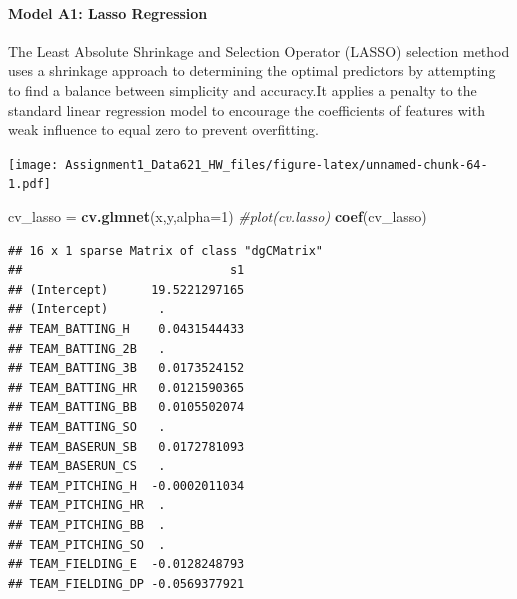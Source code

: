\documentclass[
]{article}
\newenvironment{Shaded}{\begin{snugshade}}{\end{snugshade}}
\newcommand{\AttributeTok}[1]{\textcolor[rgb]{0.13,0.29,0.53}{#1}}
\newcommand{\CommentTok}[1]{\textcolor[rgb]{0.56,0.35,0.01}{\textit{#1}}}
\newcommand{\ConstantTok}[1]{\textcolor[rgb]{0.56,0.35,0.01}{#1}}
\newcommand{\DecValTok}[1]{\textcolor[rgb]{0.00,0.00,0.81}{#1}}
\newcommand{\FunctionTok}[1]{\textcolor[rgb]{0.13,0.29,0.53}{\textbf{#1}}}
\newcommand{\NormalTok}[1]{#1}
\newcommand{\OtherTok}[1]{\textcolor[rgb]{0.56,0.35,0.01}{#1}}
\newcommand{\SpecialCharTok}[1]{\textcolor[rgb]{0.81,0.36,0.00}{\textbf{#1}}}
\newcommand{\StringTok}[1]{\textcolor[rgb]{0.31,0.60,0.02}{#1}}
\begin{document}
\paragraph{Model A1: Lasso Regression}\label{model-a1-lasso-regression}

The Least Absolute Shrinkage and Selection Operator (LASSO) selection
method uses a shrinkage approach to determining the optimal predictors
by attempting to find a balance between simplicity and accuracy.It
applies a penalty to the standard linear regression model to encourage
the coefficients of features with weak influence to equal zero to
prevent overfitting.

\begin{Shaded}
\end{Shaded}

\texttt{[image: Assignment1\_Data621\_HW\_files/figure-latex/unnamed-chunk-64-1.pdf]}

\begin{Shaded}
\begin{Highlighting}[]
\NormalTok{cv\_lasso }\OtherTok{=} \FunctionTok{cv.glmnet}\NormalTok{(x,y,}\AttributeTok{alpha=}\DecValTok{1}\NormalTok{)}
\CommentTok{\#plot(cv.lasso)}
\FunctionTok{coef}\NormalTok{(cv\_lasso)}
\end{Highlighting}
\end{Shaded}

\begin{verbatim}
## 16 x 1 sparse Matrix of class "dgCMatrix"
##                             s1
## (Intercept)      19.5221297165
## (Intercept)       .           
## TEAM_BATTING_H    0.0431544433
## TEAM_BATTING_2B   .           
## TEAM_BATTING_3B   0.0173524152
## TEAM_BATTING_HR   0.0121590365
## TEAM_BATTING_BB   0.0105502074
## TEAM_BATTING_SO   .           
## TEAM_BASERUN_SB   0.0172781093
## TEAM_BASERUN_CS   .           
## TEAM_PITCHING_H  -0.0002011034
## TEAM_PITCHING_HR  .           
## TEAM_PITCHING_BB  .           
## TEAM_PITCHING_SO  .           
## TEAM_FIELDING_E  -0.0128248793
## TEAM_FIELDING_DP -0.0569377921
\end{verbatim}
\end{document}
